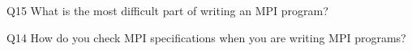 \begin{description}%
\item{Q15} What is the most difficult part of writing an MPI program?%
\item{Q14} How do you check MPI specifications when you are writing MPI programs?%
\end{description}%
